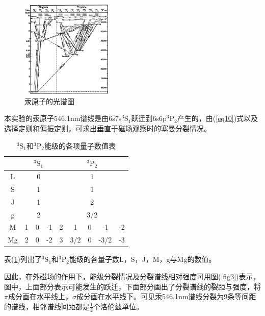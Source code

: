 \documentclass{buaaemp}
\begin{document}
\begin{figure}
    \centering
    \includegraphics[width=0.4\textwidth]{mercury_spectrum.png}
    \caption{汞原子的光谱图}
    \label{fig:sepctrum}
\end{figure}

本实验的汞原子546.1nm谱线是由6s7s$^3$S$_1$跃迁到6s6p$^3$P$_2$产生的，由(\ref{eq10})式以及选择定则和偏振定则，可求出垂直于磁场观察时的塞曼分裂情况。
\begin{table}[!h]
\centering
\caption{$^3\text{S}_1$和$^3\text{P}_2$能级的各项量子数值表}\label{table1}
\begin{tabular}{|c|c|c|c|c|c|c|c|c|}
\hline
   & \multicolumn{3}{c|}{$^3\text{S}_1$} & \multicolumn{5}{c|}{$^3\text{P}_2$} \\ \hline
L  & \multicolumn{3}{c|}{0}              & \multicolumn{5}{c|}{1}              \\ \hline
S  & \multicolumn{3}{c|}{1}              & \multicolumn{5}{c|}{1}              \\ \hline
J  & \multicolumn{3}{c|}{1}              & \multicolumn{5}{c|}{2}              \\ \hline
g  & \multicolumn{3}{c|}{2}              & \multicolumn{5}{c|}{3/2}            \\ \hline
M  & 1          & 0         & -1         & 2    & 1      & 0   & -1     & -2   \\ \hline
Mg & 2          & 0         & -2         & 3    & 3/2    & 0   & -3/2   & -3   \\ \hline
\end{tabular}
\end{table}
表(\ref{table1})列出了$^3\text{S}_1$和$^3\text{P}_2$能级的各量子数L，S，J，M，g与Mg的数值。

因此，在外磁场的作用下，能级分裂情况及分裂谱线相对强度可用图(\ref{fig3})表示，图中，上面部分表示可能发生的跃迁，下面部分画出了分裂谱线的裂距与强度，将$\pi$成分画在水平线上，$\sigma$成分画在水平线下。可见汞546.1nm谱线分裂为9条等间距的谱线，相邻谱线间距都是$\frac{1}{2}$个洛伦兹单位。
\end{document}
